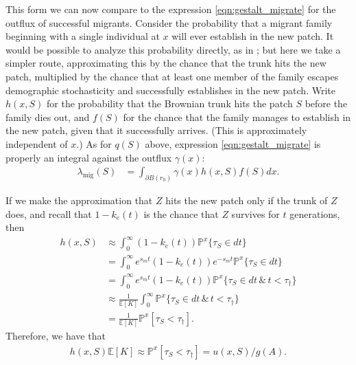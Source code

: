 \documentclass{article}
\newcommand{\citet}[1]{\cite{#1}}
\renewcommand{\P}{\mathbb{P}}
\newcommand{\E}{\mathbb{E}}
\newcommand{\migrate}{\lambda_\text{mig}}
\begin{document}
This form we can now compare to 
the expression \eqref{eqn:gestalt_migrate} for the outflux of successful migrants.
Consider the probability that a migrant family beginning with a single individual at $x$ will ever establish in the new patch.
It would be possible to analyze this probability directly,
as in \citet{barton1987establishment};
but here we take a simpler route, 
approximating this by the chance that the trunk hits the new patch,
multiplied by the chance that at least one member of the family escapes demographic stochasticity
and successfully establishes in the new patch.
Write $h(x,S)$ for the probability that the Brownian trunk hits the patch $S$
before the family dies out,
and $f(S)$ for the chance that the family manages to establish in the new patch,
given that it successfully arrives.
(This is approximately independent of $x$.)
As for $q(S)$ above, expression \eqref{eqn:gestalt_migrate} is properly an integral against the outflux $\gamma(x)$:
\begin{align}\label{eqn:migrate_integral}
  \migrate(S) &= \int_{\partial B(r_0)} \gamma(x) h(x,S) f(S) dx .
\end{align}


If we make the approximation that $Z$ hits the new patch only if the trunk of $Z$ does,
and recall that $1-k_e(t)$ is the chance that $Z$ survives for $t$ generations,
then 
\begin{align}
    h(x,S) &\approx \int_0^\infty (1-k_e(t)) \P^x\{ \tau_S \in dt \} \\
           &= \int_0^\infty e^{s_m t} (1-k_e(t)) e^{- s_m t } \P^x\{ \tau_S \in dt \} \\
           &=\int_0^\infty e^{s_m t} (1-k_e(t)) \P^x\{ \tau_S \in dt \, \& \, t < \tau_\dagger \} \\
           &\approx \frac{1}{\E[K]} \int_0^\infty \P^x\{ \tau_S \in dt \, \& \, t < \tau_\dagger \} \\
    &= \frac{1}{\E[K]} \P^x[ \tau_S < \tau_\dagger ] .
\end{align}
Therefore, we have that
\begin{align} \label{eqn:boils_downto}
    h(x,S) \E[K] 
    \approx \P^x[ \tau_S < \tau_\dagger ] 
    = u(x,S) / g(A) .
\end{align}
\end{document}
